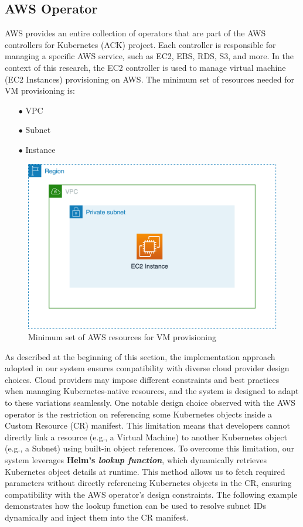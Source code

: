 \subsection{AWS Operator}

AWS provides an entire collection of operators that are part of the AWS controllers for Kubernetes (ACK) project.
Each controller is responsible for managing a specific AWS service, such as EC2, EBS, RDS, S3, and more. In the context of this research, the EC2 controller is used to manage virtual machine (EC2 Instances) provisioning on AWS.
The minimum set of resources needed for VM provisioning is:
\begin{itemize}[itemsep=0.2pt, topsep=1pt] 
\item[$\bullet$] VPC
\item[$\bullet$] Subnet
\item[$\bullet$] Instance
\end{itemize}

\begin{figure}[H]
\centering
\includegraphics[width=0.75\linewidth]{images/aws.png}
\caption{Minimum set of AWS resources for VM provisioning}
\label{fig:aws}
\end{figure}

As described at the beginning of this section, the implementation approach adopted in our system ensures compatibility with diverse cloud provider design choices. Cloud providers may impose different constraints and best practices when managing Kubernetes-native resources, and the system is designed to adapt to these variations seamlessly.
One notable design choice observed with the AWS operator is the restriction on referencing some Kubernetes objects inside a Custom Resource (CR) manifest. This limitation means that developers cannot directly link a resource (e.g., a Virtual Machine) to another Kubernetes object (e.g., a Subnet) using built-in object references.
To overcome this limitation, our system leverages \textbf{Helm’s \textit{lookup function}}, which dynamically retrieves Kubernetes object details at runtime. This method allows us to fetch required parameters without directly referencing Kubernetes objects in the CR, ensuring compatibility with the AWS operator’s design constraints. The following example demonstrates how the lookup function can be used to resolve subnet IDs dynamically and inject them into the CR manifest. \newline

